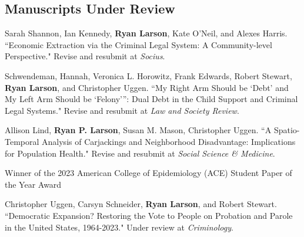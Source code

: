 \documentclass[letterpaper]{article}
\renewenvironment{itemize}{
  \begin{list}{}{
    \setlength{\leftmargin}{1.5em}
  }
}{
  \end{list}
}
\begin{document}
\subsection*{Manuscripts Under Review}
\begin{itemize}

\item Sarah Shannon, Ian Kennedy, \textbf{Ryan Larson}, Kate O'Neil, and Alexes Harris. ``Economic Extraction via the Criminal Legal System: A Community-level Perspective." Revise and resubmit at \textit{Socius}. 

\item Schwendeman, Hannah, Veronica L. Horowitz, Frank Edwards, Robert Stewart,  \textbf{Ryan Larson}, and Christopher Uggen. ``My Right Arm Should be ‘Debt’ and My Left Arm Should be ‘Felony’”: Dual Debt in the Child Support and Criminal Legal Systems." Revise and resubmit at \textit{Law and Society Review}. 

\item Allison Lind, \textbf{Ryan P. Larson}, Susan M. Mason, Christopher Uggen. ``A Spatio-Temporal Analysis of Carjackings and Neighborhood Disadvantage: Implications for Population Health." Revise and resubmit at \textit{Social Science \& Medicine}.
\begin{itemize}
\item Winner of the 2023 American College of Epidemiology (ACE) Student Paper of the Year Award
\end{itemize}

\item Christopher Uggen, Carsyn Schneider, \textbf{Ryan Larson}, and Robert Stewart. ``Democratic Expansion? Restoring the Vote to People on Probation and Parole in the United States, 1964-2023." Under review at \textit{Criminology}.

\end{itemize}
\end{document}
